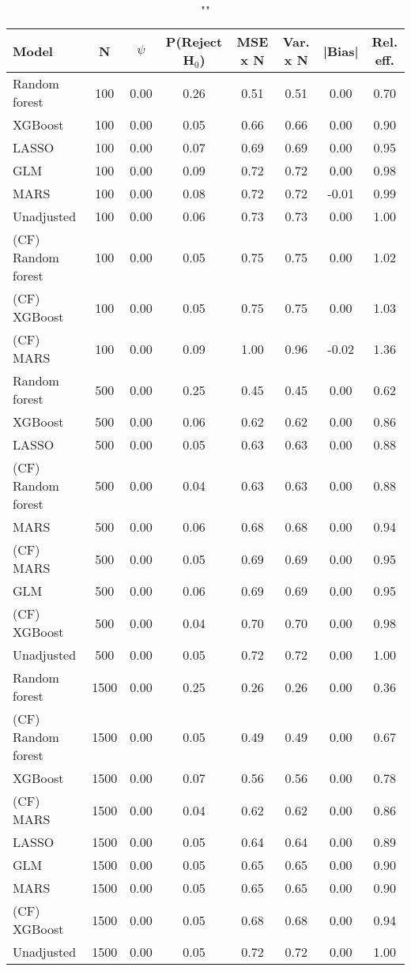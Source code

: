 \begin{table}
\centering
\caption{""}
\begin{tabular}{lccccccc}
\toprule
Model & N & $\psi$ & P(Reject H$_0$) & MSE x N & Var. x N & |Bias| & Rel. eff.\\ \midrule
Random forest & 100 & 0.00 & 0.26 & 0.51 & 0.51 &  0.00 & 0.70 \\ 
XGBoost & 100 & 0.00 & 0.05 & 0.66 & 0.66 &  0.00 & 0.90 \\ 
LASSO & 100 & 0.00 & 0.07 & 0.69 & 0.69 &  0.00 & 0.95 \\ 
GLM & 100 & 0.00 & 0.09 & 0.72 & 0.72 &  0.00 & 0.98 \\ 
MARS & 100 & 0.00 & 0.08 & 0.72 & 0.72 & -0.01 & 0.99 \\ 
Unadjusted & 100 & 0.00 & 0.06 & 0.73 & 0.73 &  0.00 & 1.00 \\ 
(CF) Random forest & 100 & 0.00 & 0.05 & 0.75 & 0.75 &  0.00 & 1.02 \\ 
(CF) XGBoost & 100 & 0.00 & 0.05 & 0.75 & 0.75 &  0.00 & 1.03 \\ 
(CF) MARS & 100 & 0.00 & 0.09 & 1.00 & 0.96 & -0.02 & 1.36 \\ \addlinespace 
Random forest & 500 & 0.00 & 0.25 & 0.45 & 0.45 &  0.00 & 0.62 \\ 
XGBoost & 500 & 0.00 & 0.06 & 0.62 & 0.62 &  0.00 & 0.86 \\ 
LASSO & 500 & 0.00 & 0.05 & 0.63 & 0.63 &  0.00 & 0.88 \\ 
(CF) Random forest & 500 & 0.00 & 0.04 & 0.63 & 0.63 &  0.00 & 0.88 \\ 
MARS & 500 & 0.00 & 0.06 & 0.68 & 0.68 &  0.00 & 0.94 \\ 
(CF) MARS & 500 & 0.00 & 0.05 & 0.69 & 0.69 &  0.00 & 0.95 \\ 
GLM & 500 & 0.00 & 0.06 & 0.69 & 0.69 &  0.00 & 0.95 \\ 
(CF) XGBoost & 500 & 0.00 & 0.04 & 0.70 & 0.70 &  0.00 & 0.98 \\ 
Unadjusted & 500 & 0.00 & 0.05 & 0.72 & 0.72 &  0.00 & 1.00 \\ \addlinespace 
Random forest & 1500 & 0.00 & 0.25 & 0.26 & 0.26 &  0.00 & 0.36 \\ 
(CF) Random forest & 1500 & 0.00 & 0.05 & 0.49 & 0.49 &  0.00 & 0.67 \\ 
XGBoost & 1500 & 0.00 & 0.07 & 0.56 & 0.56 &  0.00 & 0.78 \\ 
(CF) MARS & 1500 & 0.00 & 0.04 & 0.62 & 0.62 &  0.00 & 0.86 \\ 
LASSO & 1500 & 0.00 & 0.05 & 0.64 & 0.64 &  0.00 & 0.89 \\ 
GLM & 1500 & 0.00 & 0.05 & 0.65 & 0.65 &  0.00 & 0.90 \\ 
MARS & 1500 & 0.00 & 0.05 & 0.65 & 0.65 &  0.00 & 0.90 \\ 
(CF) XGBoost & 1500 & 0.00 & 0.05 & 0.68 & 0.68 &  0.00 & 0.94 \\ 
Unadjusted & 1500 & 0.00 & 0.05 & 0.72 & 0.72 &  0.00 & 1.00 \\
\bottomrule
\end{tabular}
\end{table}

